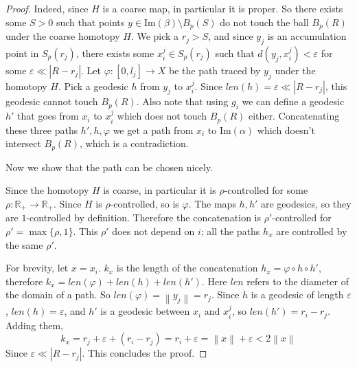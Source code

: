 \documentclass[10pt,a4paper]{amsart}
\newcommand {\Rplus}    {\mathbb{R}_{+}}
\newcommand {\im}       {\text{Im}}
\newcommand {\norm} [1] {\left\| #1 \right\|}
\begin{document}
\begin{proof}
  Indeed, since \( H \) is a coarse map, in particular it is proper. So there
  exists some \( S > 0 \) such that points \( y \in \im(\beta) \setminus B_{p}
  (S) \) do not touch the ball \( B_{p} (R) \) under the coarse homotopy \( H \).
  We pick a \( r_{j} > S \), and since \( y_{j} \) is an accumulation point in \(
  S_{p} (r_j )\), there exists some \( x_i ^j \in S_{p} (r_j) \) such that \(
  d(y_j, x_i^j) < \varepsilon \) for some \( \varepsilon \ll |R - r_j| \). Let \(
  \varphi : [0, l_j] \to X \) be the path traced by \( y_j \) under the homotopy
  \( H \). Pick a geodesic \( h \) from \( y_j \) to \( x_i^j \). Since \( len(h)
  = \varepsilon \ll |R - r_j| \), this geodesic cannot touch \( B_{p} (R) \).
  Also note that using \( g_i \) we can define a geodesic \( h' \) that goes from
  \( x_i \) to \( x_i^j \) which does not touch \( B_{p} (R) \) either.
  Concatenating these three paths \( h', h, \varphi \) we get a path from \( x_i
  \) to \( \im(\alpha) \) which doesn't intersect \( B_{p} (R) \), which is a
  contradiction.

  Now we show that the path can be chosen nicely.

  Since the homotopy \( H \) is coarse, in particular it is \( \rho
  \)-controlled for some \( \rho : \Rplus \to \Rplus \). Since \( H \) is \(
  \rho \)-controlled, so is \( \varphi \). The maps \( h,h' \) are geodesics,
  so they are \( 1 \)-controlled by definition. Therefore the concatenation is
  \( \rho' \)-controlled for \( \rho' = \max \{ \rho, 1 \} \). This \( \rho' \)
  does not depend on \( i \); all the paths \( h_x \) are controlled by the same
  \( \rho' \).

  For brevity, let \( x = x_i \). \( k_x \) is the length of the concatenation
  \( h_x = \varphi \circ h \circ h' \), therefore \( k_x = len (\varphi) + len
  (h) + len (h') \). Here \( len \) refers to the diameter of the domain of a
  path. So \( len(\varphi) = \norm {y_j} = r_j \). Since \( h \) is a geodesic
  of length \( \varepsilon \), \( len(h) = \varepsilon \), and \( h' \) is a
  geodesic between \( x_i \) and \(x_i^j \), so \( len(h') = r_i - r_j \).
  Adding them,
  \[
       k_x = r_j + \varepsilon + (r_i - r_j) = r_i + \varepsilon
          = \norm x + \varepsilon < 2 \norm x
  \] 
  Since \( \varepsilon \ll |R - r_j| \). This concludes the proof.
\end{proof}
\end{document}
